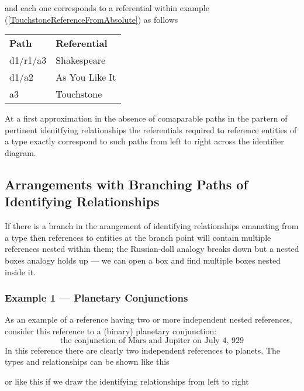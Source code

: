 and each one corresponds to a referential within example
(\ref{TouchstoneReferenceFromAbsolute}) as follows
\begin{tabular}{l l}
\textbf{Path}     & \textbf{Referential} \\
d1/r1/a3 & Shakespeare \\
d1/a2    & As You Like It\\
a3       & Touchstone
\end{tabular}

At a first approximation in the absence of comaparable paths in the partern of pertinent idenitfying relationships the referentials required to reference entities of a type exactly correspond to such paths from left to right across the identifier diagram.


\subsection{Arrangements with Branching Paths of Identifying Relationships}
If there is a branch in the arangement of identifying relationships emanating from a type then references to entities at the branch point will contain multiple  references nested within them; 
the Russian-doll analogy breaks down but a nested boxes analogy holds up --- we can open a box and find multiple boxes nested inside it. 

\subsubsection{Example 1 --- Planetary Conjunctions}
As an example of a reference having two or more independent  nested references, consider this reference to  a (binary) planetary conjunction:
\begin{equation}
\mbox{the conjunction of Mars and Jupiter on July 4, 929}
\end{equation}
In this reference there are clearly two independent references to planets. 
The types and relationships can be shown like this

\begin{equation*}

\end{equation*}
or like this if we draw the identifying relationships from left to right

\begin{equation*}

\end{equation*}

